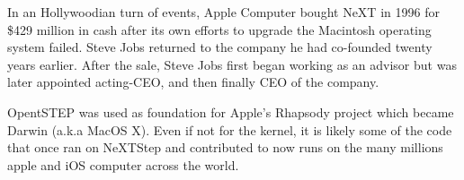 In an Hollywoodian turn of events, Apple Computer bought NeXT in 1996 for \$429 million in cash after its own efforts to upgrade the Macintosh operating system failed.  Steve Jobs returned to the company he had co-founded twenty years earlier. After the sale, Steve Jobs first began working as an advisor but was later appointed acting-CEO, and then finally CEO of the company.\\
\par
OpentSTEP was used as foundation for Apple's Rhapsody project which became Darwin (a.k.a MacOS X). Even if not for the kernel, it is likely some of the code that once ran on NeXTStep and contributed to \doom now runs on the many millions apple and iOS computer across the world.\\



